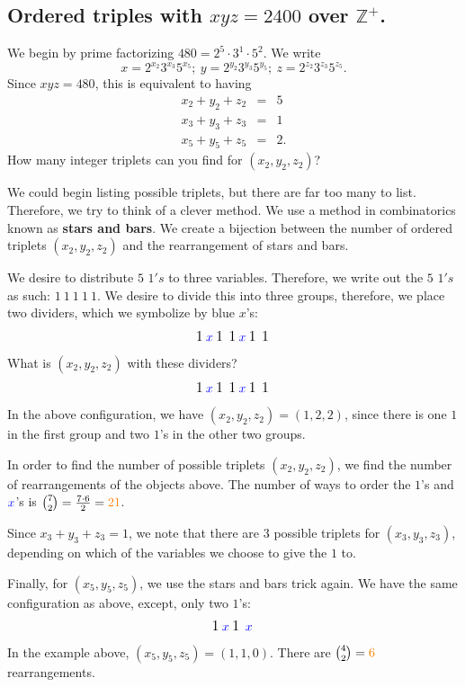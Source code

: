 \subsection{Ordered triples with $xyz=2400$ over $\mathbb{Z}^{+}$.}

We begin by prime factorizing $480=2^5\cdot 3^1\cdot 5^2$. We write $$x=2^{x_2}3^{x_3}5^{x_5};\: y=2^{y_2}3^{y_3}5^{y_5};\: z=2^{z_2}3^{z_3}5^{z_5}.$$ Since $xyz=480$, this is equivalent to having \begin{eqnarray*} x_2+y_2+z_2 &=& 5 \\ x_3+y_3+z_3&=&1 \\ x_5+y_5+z_5&=&2. \end{eqnarray*}
How many integer triplets can you find for $(x_2, y_2, z_2)$?
\clearpage

We could begin listing possible triplets, but there are far too many to list. Therefore, we try to think of a clever method. We use a method in combinatorics known as \textbf{stars and bars}. We create a bijection between the number of ordered triplets $(x_2, y_2, z_2)$ and the rearrangement of stars and bars.

We desire to distribute $5$ $1's$ to three variables. Therefore, we write out the $5$ $1's$ as such: $1\: 1\: 1\: 1\: 1.$ We desire to divide this into three groups, therefore, we place two dividers, which we symbolize by \color{blue} blue $x$'s: \color{black} $$\mathlarger{1}\:\color{blue}x\color{black}\: \mathlarger{1}\:\: \mathlarger{1}\:\color{blue}x\color{black}\: \mathlarger{1}\:\: \mathlarger{1}\:$$ What is $(x_2, y_2, z_2)$ with these dividers?
\clearpage
$$\mathlarger{1}\:\color{blue}x\color{black}\: \mathlarger{1}\:\: \mathlarger{1}\:\color{blue}x\color{black}\: \mathlarger{1}\:\: \mathlarger{1}\:$$In the above configuration, we have $(x_2, y_2, z_2)=(1,2,2)$, since there is one $1$ in the first group and two $1$'s in the other two groups. 

In order to find the number of possible triplets $(x_2, y_2, z_2)$, we find the number of rearrangements of the objects above. The number of ways to order the $1$'s and $\color{blue} x\color{black}$'s is $\binom{7}{2}=\frac{7\cdot 6}{2}=\color{orange} 21$. \color{black}

Since $x_3+y_3+z_3=1$, we note that there are \color{orange} $3$ \color{black} possible triplets for $(x_3, y_3, z_3)$, depending on which of the variables we choose to give the $1$ to.

\clearpage

Finally, for $(x_5, y_5, z_5)$, we use the stars and bars trick again. We have the same configuration as above, except, only two $1$'s: $$\mathlarger{1}\:\color{blue}x\color{black}\: \mathlarger{1}\:\: \color{blue}x\color{black}\:$$In the example above, $(x_5, y_5, z_5)=(1, 1, 0)$. There are $\binom{4}{2}=\color{orange}6\color{black}$ rearrangements.

